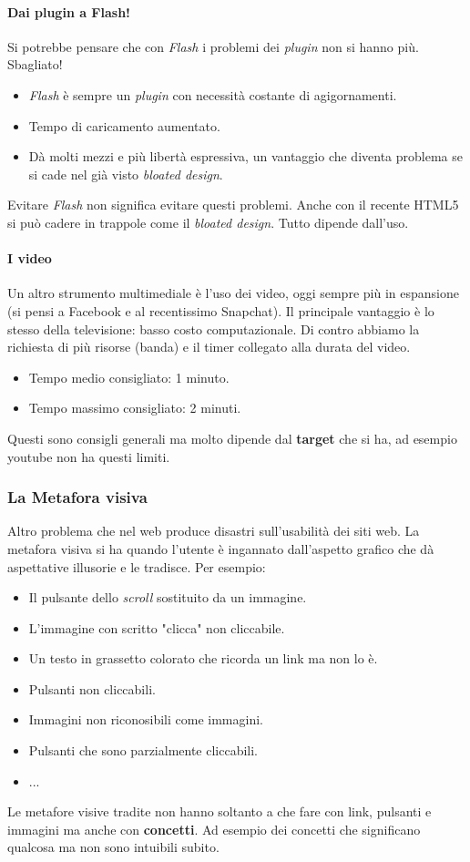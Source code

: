 			\paragraph{Dai plugin a Flash!}
				Si potrebbe pensare che con \emph{Flash} i problemi dei \emph{plugin} non si hanno più. Sbagliato!
				\begin{itemize}
					\item \emph{Flash} è sempre un \emph{plugin} con necessità costante di agigornamenti.
					\item Tempo di caricamento aumentato.
					\item Dà molti mezzi e più libertà espressiva, un vantaggio che diventa problema se si cade nel già visto \emph{bloated design}.
				\end{itemize}
				Evitare \emph{Flash} non significa evitare questi problemi. Anche con il recente HTML5 si può cadere in trappole come il \emph{bloated design}. Tutto dipende dall'uso.
			
			\paragraph{I video}
				Un altro strumento multimediale è l'uso dei video, oggi sempre più in espansione (si pensi a Facebook e al recentissimo Snapchat). Il principale vantaggio è lo stesso della televisione: basso costo computazionale. Di contro abbiamo la richiesta di più risorse (banda) e il timer collegato alla durata del video. 
				\begin{itemize}
					\item Tempo medio consigliato: 1 minuto.
					\item Tempo massimo consigliato: 2 minuti.
				\end{itemize}
				Questi sono consigli generali ma molto dipende dal \textbf{target} che si ha, ad esempio youtube non ha questi limiti.
		
		\subsubsection{La Metafora visiva}
			Altro problema che nel web produce disastri sull'usabilità dei siti web. La metafora visiva si ha quando l'utente è ingannato dall'aspetto grafico che dà aspettative illusorie e le tradisce. Per esempio:
			\begin{itemize}
				\item Il pulsante dello \emph{scroll} sostituito da un immagine.
				\item L'immagine con scritto "clicca" non cliccabile.
				\item Un testo in grassetto colorato che ricorda un link ma non lo è.
				\item Pulsanti non cliccabili.
				\item Immagini non riconosibili come immagini.
				\item Pulsanti che sono parzialmente cliccabili.
				\item ...
			\end{itemize}
			Le metafore visive tradite non hanno soltanto a che fare con link, pulsanti e immagini ma anche con \textbf{concetti}. Ad esempio dei concetti che significano qualcosa ma non sono intuibili subito.
		
